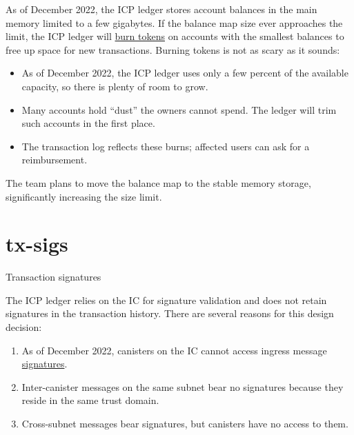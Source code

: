 \documentclass{article}
\begin{document}
As of December 2022, the ICP ledger stores account balances in the main memory limited to a few gigabytes.
If the balance map size ever approaches the limit, the ICP ledger will \href{https://github.com/dfinity/ic/blob/a26b66d0bf5dea702e20da7218ceb6a5ee16fbbb/rs/rosetta-api/ledger_canister_core/src/ledger.rs#L192-L213}{burn tokens} on accounts with the smallest balances to free up space for new transactions.
Burning tokens is not as scary as it sounds:
\begin{itemize}
  \item
    As of December 2022, the ICP ledger uses only a few percent of the available capacity, so there is plenty of room to grow.
  \item
    Many accounts hold ``dust'' the owners cannot spend.
    The ledger will trim such accounts in the first place.
  \item
    The transaction log reflects these burns; affected users can ask for a reimbursement.
\end{itemize}

The team plans to move the balance map to the stable memory storage, significantly increasing the size limit.

\section{tx-sigs}{Transaction signatures}

The ICP ledger relies on the IC for signature validation and does not retain signatures in the transaction history.
There are several reasons for this design decision:
\begin{enumerate}
  \item
    As of December 2022, canisters on the IC cannot access ingress message \href{https://internetcomputer.org/docs/current/references/ic-interface-spec#signatures}{signatures}.
  \item
    Inter-canister messages on the same subnet bear no signatures because they reside in the same trust domain.
  \item
    Cross-subnet messages bear signatures, but canisters have no access to them.
\end{enumerate}
\end{document}
